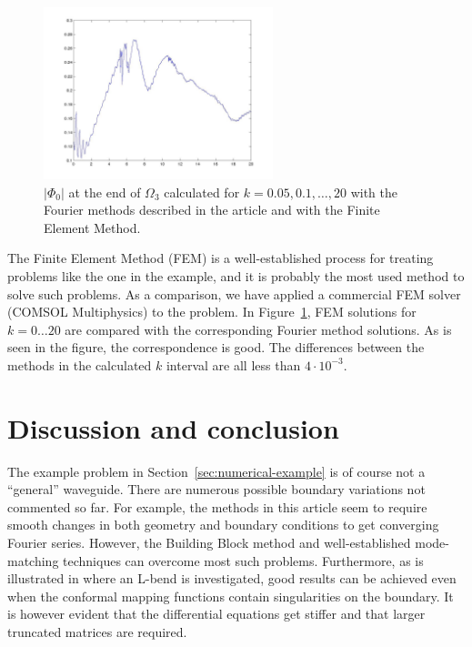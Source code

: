 \documentclass[numreferences]{kluwer}
\providecommand{\abs}[1]{\left\lvert#1\right\rvert}
\renewcommand{\Phi}{\varPhi}
\renewcommand{\Phi}{\varPhi}
\begin{document}
\begin{figure}[htb]
  \centering
  \includegraphics[keepaspectratio=false,height=5cm,width=\textwidth]
  {FEMvsFourier}
  \caption{$\abs{\Phi_{0}}$ at the end of $\Omega_3$ calculated for
    $k=0.05,0.1,\dots,20$ with the Fourier methods described in the
    article and with the Finite Element Method.}
  \label{fig:FEMvsFourier}
\end{figure}

The Finite Element Method (FEM) is a well-established process for
treating problems like the one in the example, and it is probably the
most used method to solve such problems. As a comparison, we have
applied a commercial FEM solver (COMSOL Multiphysics) to the
problem. In Figure~\ref{fig:FEMvsFourier}, FEM solutions for $k=0\dots20$
are compared with the corresponding Fourier method solutions. As is
seen in the figure, the correspondence is good. The differences
between the methods in the calculated $k$ interval are all less than
$4\cdot10^{-3}$.


\section{Discussion and conclusion}
\label{sec:conclusion}

The example problem in Section~\ref{sec:numerical-example} is of
course not a ``general'' wave\-guide. There are numerous possible
boundary variations not commented so far. For example, the methods in
this article seem to require smooth changes in both geometry and
boundary conditions to get converging Fourier series. However, the
Building Block method and well-established mode-matching techniques
can overcome most such problems. Furthermore, as is illustrated in
\cite{Nilsson:2002} where an L-bend is investigated, good results can
be achieved even when the conformal mapping functions contain
singularities on the boundary. It is however evident that the
differential equations get stiffer and that larger truncated matrices
are required.
\end{document}
